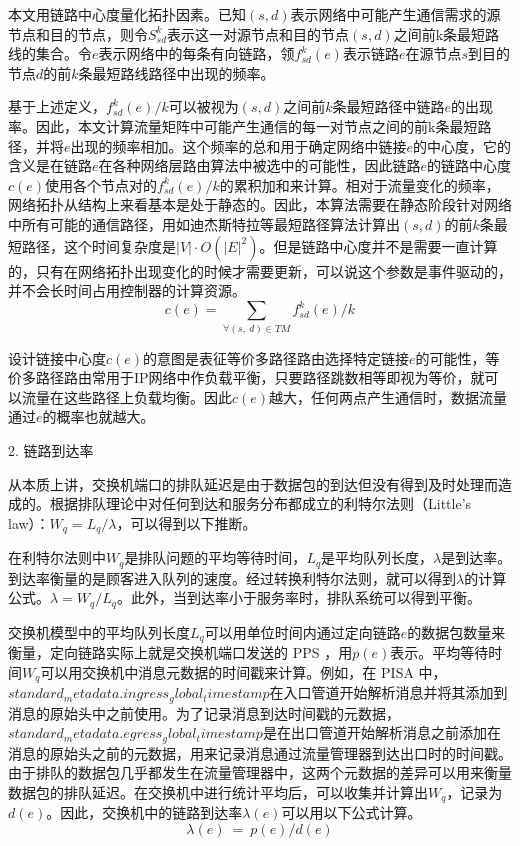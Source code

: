 本文用链路中心度量化拓扑因素。已知$(s,d)$表示网络中可能产生通信需求的源节点和目的节点，则令$S_{sd}^k$表示这一对源节点和目的节点$(s,d)$之间前k条最短路线的集合。令$e$表示网络中的每条有向链路，领$f_{sd}^k(e)$表示链路$e$在源节点$s$到目的节点$d$的前$k$条最短路线路径中出现的频率。

基于上述定义，$f_{sd}^k(e)/k$可以被视为$(s,d)$之间前$k$条最短路径中链路$e$的出现率。因此，本文计算流量矩阵中可能产生通信的每一对节点之间的前k条最短路径，并将$e$出现的频率相加。这个频率的总和用于确定网络中链接$e$的中心度，它的含义是在链路$e$在各种网络层路由算法中被选中的可能性，因此链路$e$的链路中心度$c(e)$使用各个节点对的$f_{sd}^k(e)/k$的累积加和来计算。相对于流量变化的频率，网络拓扑从结构上来看基本是处于静态的。因此，本算法需要在静态阶段针对网络中所有可能的通信路径，用如迪杰斯特拉等最短路径算法计算出$(s,d)$的前$k$条最短路径，这个时间复杂度是$|V|\cdot O({|E|}^2)$。但是链路中心度并不是需要一直计算的，只有在网络拓扑出现变化的时候才需要更新，可以说这个参数是事件驱动的，并不会长时间占用控制器的计算资源。
$$c\left(e\right)=\sum_{\forall(s,\ d)\in T M}{f_{sd}^k\left(e\right)}/k$$

设计链接中心度$c(e)$的意图是表征等价多路径路由选择特定链接$e$的可能性，等价多路径路由常用于IP网络中作负载平衡，只要路径跳数相等即视为等价，就可以流量在这些路径上负载均衡。因此$c(e)$越大，任何两点产生通信时，数据流量通过$e$的概率也就越大。

2. 链路到达率

从本质上讲，交换机端口的排队延迟是由于数据包的到达但没有得到及时处理而造成的。根据排队理论中对任何到达和服务分布都成立的利特尔法则（Little's law）：$W_q=L_q/\lambda$，可以得到以下推断。

在利特尔法则中$W_q$是排队问题的平均等待时间，$L_q$是平均队列长度，$\lambda$是到达率。到达率衡量的是顾客进入队列的速度。经过转换利特尔法则，就可以得到$\lambda$的计算公式。$\lambda=W_q/L_q$。此外，当到达率小于服务率时，排队系统可以得到平衡。

交换机模型中的平均队列长度$L_q$可以用单位时间内通过定向链路$e$的数据包数量来衡量，定向链路实际上就是交换机端口发送的 \gls*{PPS} ，用$p(e)$表示。平均等待时间$W_q$可以用交换机中消息元数据的时间戳来计算。例如，在 \gls*{PISA} 中，$standard_metadata.ingress_global_timestamp$在入口管道开始解析消息并将其添加到消息的原始头中之前使用。为了记录消息到达时间戳的元数据，$standard_metadata.egress_global_timestamp$是在出口管道开始解析消息之前添加在消息的原始头之前的元数据，用来记录消息通过流量管理器到达出口时的时间戳。由于排队的数据包几乎都发生在流量管理器中，这两个元数据的差异可以用来衡量数据包的排队延迟。在交换机中进行统计平均后，可以收集并计算出$W_q$，记录为$d(e)$。因此，交换机中的链路到达率$\lambda(e)$可以用以下公式计算。
$$\lambda(e)\ =\ p(e)/d(e)$$


